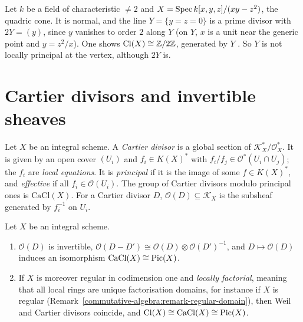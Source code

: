 \begin{example}\label{divisors:example-quadric-cone}
Let $k$ be a field of characteristic $\neq 2$ and $X = \operatorname{Spec} k[x, y, z]/(xy - z^2)$, the quadric cone. It is normal, and the line $Y = \{y = z = 0\}$ is a prime divisor with
$2Y = (y)$, since $y$ vanishes to order $2$ along $Y$ (on $Y$, $x$ is a unit near the generic point and $y = z^2/x$). One shows $\mathrm{Cl}(X) \cong \mathbb{Z}/2\mathbb{Z}$,
generated by $Y$ \cite[Example II.6.5.2]{hartshorne-ag}. So $Y$ is not locally principal at the vertex, although $2Y$ is.
\end{example}

\section{Cartier divisors and invertible sheaves}\label{divisors:section-cartier}

\begin{definition}\label{divisors:definition-cartier}
Let $X$ be an integral scheme. A \emph{Cartier divisor} is a global section of $\mathcal{K}_X^*/\mathcal{O}_X^*$. It is given by an open cover $(U_i)$ and
$f_i \in K(X)^*$ with $f_i/f_j \in \mathcal{O}^*(U_i \cap U_j)$; the $f_i$ are \emph{local equations}. It is \emph{principal} if it is the image of some
$f \in K(X)^*$, and \emph{effective} if all $f_i \in \mathcal{O}(U_i)$. The group of Cartier divisors modulo principal ones is $\mathrm{CaCl}(X)$. For a Cartier divisor
$D$, $\mathcal{O}(D) \subseteq \mathcal{K}_X$ is the subsheaf generated by $f_i^{-1}$ on $U_i$.
\end{definition}

\begin{proposition}\label{divisors:proposition-cartier-picard}
Let $X$ be an integral scheme.
\begin{enumerate}
\item $\mathcal{O}(D)$ is invertible, $\mathcal{O}(D - D') \cong \mathcal{O}(D) \otimes \mathcal{O}(D')^{-1}$, and $D \mapsto \mathcal{O}(D)$ induces an isomorphism
$\mathrm{CaCl}(X) \cong \operatorname{Pic}(X)$.
\item If $X$ is moreover regular in codimension one and \emph{locally factorial}, meaning that all local rings are unique factorisation domains, for instance if $X$ is
regular (Remark~\ref{commutative-algebra:remark-regular-domain}), then Weil and Cartier divisors coincide, and $\mathrm{Cl}(X) \cong \mathrm{CaCl}(X) \cong \operatorname{Pic}(X)$.
\end{enumerate}
\end{proposition}

